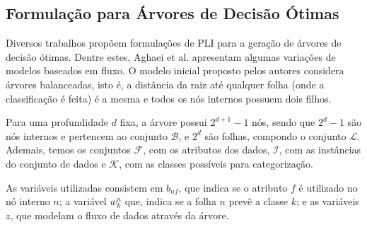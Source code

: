 \documentclass[12pt,a4paper]{article}
\begin{document}
\subsection{Formulação para Árvores de Decisão Ótimas}

Diversos trabalhos propõem formulações de PLI para a geração de árvores de decisão ótimas.
Dentre estes, Aghaei et al. \cite{Aghaei24} apresentam algumas variações de modelos baseados em fluxo.
O modelo inicial proposto pelos autores considera árvores balanceadas, isto é, a distância
da raiz até qualquer folha (onde a classificação é feita) é a mesma e todos os nós internos possuem dois filhos.

Para uma profundidade $d$ fixa, a árvore possui $2^{d+1}-1$ nós, sendo que $2^d-1$ são nós internos e pertencem 
ao conjunto $\mathcal{B}$, e $2^d$ são folhas, compondo o conjunto $ \mathcal{L}$. 
Ademais, temos os conjuntos $\mathcal{F}$, com os atributos dos dados, $\mathcal{I}$, com as instâncias do conjunto de dados
e $\mathcal{K}$, com as classes possíveis para categorização.

As variáveis utilizadas consistem em $b_{nf}$, que indica se o atributo $f$ é utilizado no nó interno $n$;
a variável $w_{k}^n$ que, indica se a folha $n$ prevê a classe $k$; e as variáveis $z$, 
que modelam o fluxo de dados através da árvore.
\end{document}
